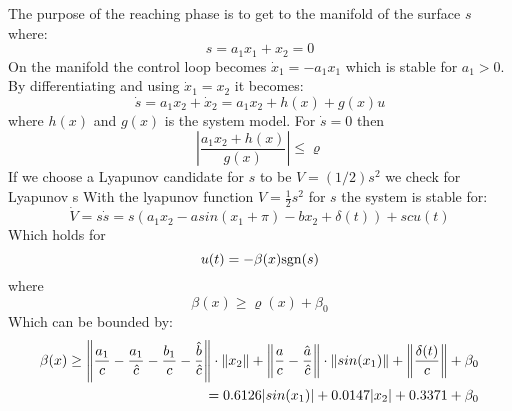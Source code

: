 The purpose of the reaching phase is to get to the manifold of the surface $s$ where:
\begin{equation}
  s = a_1 x_1 + x_2 = 0
\end{equation}
On the manifold the control loop becomes $ \dot{x}_1 = - a_1 x_1$ which is stable for $ a_1 > 0$.
By differentiating and using $ \dot{x}_1 = x_2 $ it becomes:
\begin{equation}
        \dot{s} = a_1 x_2 + \dot{x}_2 = a_1 x_2 + h(x) + g(x)u
\end{equation}
where $h(x)$ and $g(x)$ is the system model. For $\dot{s} = 0$ then
\begin{equation}
        \left\vert \frac{a_1 x_2 + h(x)}{g(x)} \right\vert \leq \varrho
\end{equation}
If we choose a Lyapunov candidate for $s$ to be $V = (1/2)s^2$ we check for Lyapunov s
With the lyapunov function $V = \frac{1}{2} s^2 $ for $ s $ the system is stable for:
\begin{equation}
  \dot{V} = s \dot{s} =  s (a_1 x_2 - a sin(x_1 + \pi) - b x_2  + \delta (t) ) + s c u(t)
\end{equation}
Which holds for
\begin{equation}
  u(t) = -\beta (x) \mathrm{sgn}(s)
\end{equation}
where
\begin{equation}
  \beta (x) \geq \varrho (x) + \beta_0
\end{equation}
Which can be bounded by:
\begin{equation}
  \begin{split}
    \beta (x) \geq \left\Vert \frac{a_1}{c} - \frac{a_1}{\hat{c}} -  \frac{b_1}{c} - \frac{\hat{b}}{\hat{c}}  \right\Vert \cdot \left\Vert x_2 \right\Vert + \left\Vert \frac{a}{c} - \frac{\hat{a}}{\hat{c}}  \right\Vert \cdot \left\Vert sin(x_1) \right\Vert + \left\Vert \frac{\delta (t)}{c} \right\Vert + \beta_0 \\
    = 0.6126 |sin(x_1)| + 0.0147 |x_2| + 0.3371 + \beta_0
  \end{split}
\end{equation}

